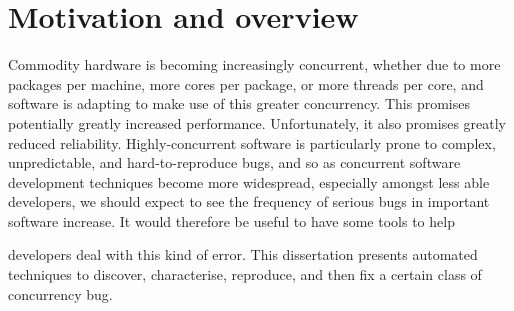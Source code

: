 
\section{Motivation and overview}
\label{sect:intro:overview}

Commodity hardware is becoming increasingly concurrent, whether due to
more packages per machine, more cores per package, or more threads per
core, and software is adapting to make use of this greater
concurrency.  This promises potentially greatly increased performance.
Unfortunately, it also promises greatly reduced reliability.
Highly-concurrent software is particularly prone to complex,
unpredictable, and hard-to-reproduce bugs, and so as concurrent
software development techniques become more widespread, especially
amongst less able developers, we should expect to see the frequency of
serious bugs in important software increase.  It would therefore be
useful to have some tools to help
developers deal with this kind of
error.  This dissertation presents automated techniques to discover,
characterise, reproduce, and then fix a certain class of concurrency
bug.


